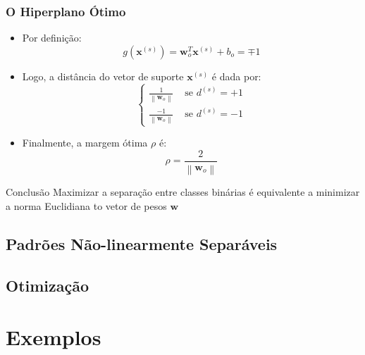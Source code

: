 \documentclass{beamer}
\begin{document}
\begin{frame}
	\frametitle{O Hiperplano Ótimo}
	
	\begin{itemize}
		\item Por definição:
		\begin{equation}
			g(\textbf{x}^{(s)}) = \textbf{w}^T_o\textbf{x}^{(s)} + b_o = \mp 1
			\label{eq:support-vectors}
		\end{equation}	
		\item Logo, a distância do vetor de suporte $\textbf{x}^{(s)}$ é dada por:
		\begin{equation}
		\begin{cases}
			\frac{1}{\left \| \textbf{w}_o \right \|} & \text{ se } d^{(s)}= +1\\ 
			\frac{-1}{\left \| \textbf{w}_o \right \|}& \text{ se } d^{(s)}= -1 
		\end{cases}
		\end{equation}
		\item Finalmente, a margem ótima $\rho$ é:
		\begin{equation}
			\rho = \frac{2}{\left \| \textbf{w}_o \right \|}
		\end{equation}
	\end{itemize}	
	
	\begin{block}{Conclusão}
		Maximizar a separação entre classes binárias é equivalente a minimizar a norma Euclidiana to vetor de pesos $\textbf{w}$
	\end{block}

\end{frame}


\subsection{Padrões Não-linearmente Separáveis}

\subsection{Otimização}

\section{Exemplos}
\end{document}
